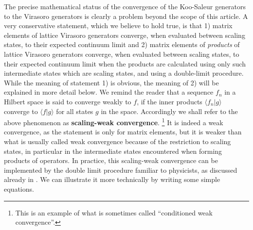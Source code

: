\documentclass[a4paper,10pt]{article}
\begin{document}
The precise mathematical status of the convergence of the Koo-Saleur generators to the Virasoro generators is clearly a problem beyond the scope of this article. A very conservative statement, which we believe to hold true, is that  1) matrix elements of lattice Virasoro generators converge, when evaluated between scaling states,  to their expected continuum limit and 2)
matrix elements of  {\sl products} of lattice Virasoro generators converge, when evaluated between scaling states, to their expected continuum limit when the products are calculated using only such intermediate states which are scaling states, and using  a double-limit procedure. While the meaning of statement 1) is obvious, the meaning of 2) will be explained in more detail below. 
%
% 
We remind the reader that a sequence $f_n$ in a Hilbert space is said to converge weakly to $f$, if the inner products $\langle f_n | g \rangle$ converge to $\langle f | g \rangle$ for all states $g$ in the space. Accordingly we shall refer to the above phenomenon as {\bf scaling-weak convergence}.%
\footnote{This is an example of what is sometimes called ``conditioned weak convergence''.}
It is indeed a weak convergence, as the statement is only for matrix elements, but it is weaker than what is usually called weak convergence because of the restriction to scaling states, in particular in the intermediate states encountered when forming products of operators. In practice, this scaling-weak convergence can be implemented by the  double limit procedure familiar to physicists, as discussed already in \cite{KooSaleur}. We can illustrate it more technically by writing some simple equations. 
\end{document}
